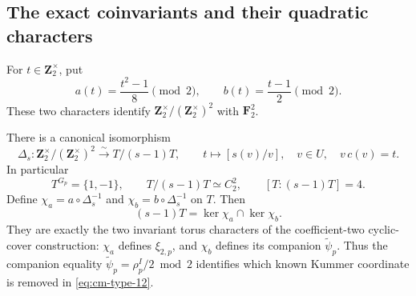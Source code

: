 \subsection{The exact coinvariants and their quadratic characters}

For \(t\in\mathbf Z_2^\times\), put
\[
 a(t)=\frac{t^2-1}{8}\pmod2,
 \qquad b(t)=\frac{t-1}{2}\pmod2.
\]
These two characters identify
\(\mathbf Z_2^\times/(\mathbf Z_2^\times)^2\) with
\(\mathbf F_2^2\).

\begin{theorem}\label{thm:full-cyclotomic-torus-coinvariants}
There is a canonical isomorphism
\begin{equation}
 \Delta_s:\mathbf Z_2^\times/(\mathbf Z_2^\times)^2
       \xrightarrow{\ \sim\ }T/(s-1)T,
 \qquad
 t\longmapsto[s(v)/v],\quad v\in U,\quad v\,c(v)=t.
                                                        \label{eq:cm-type-10}
\end{equation}
In particular
\begin{equation}
 T^{G_p}=\{1,-1\},\qquad
 T/(s-1)T\simeq C_2^2,
 \qquad [T:(s-1)T]=4.                                  \label{eq:cm-type-11}
\end{equation}
Define
\(\chi_a=a\circ\Delta_s^{-1}\) and
\(\chi_b=b\circ\Delta_s^{-1}\) on \(T\). Then
\begin{equation}
             (s-1)T=\ker\chi_a\cap\ker\chi_b.           \label{eq:cm-type-12}
\end{equation}
They are exactly the two invariant torus characters of the
coefficient-two cyclic-cover construction: \(\chi_a\) defines
\(\xi_{2,p}\), and \(\chi_b\) defines its companion
\(\widetilde\psi_p\). Thus the companion equality
\(\widetilde\psi_p=\rho_p^I/2\bmod2\) identifies which known
Kummer coordinate is removed in \eqref{eq:cm-type-12}.
\end{theorem}

